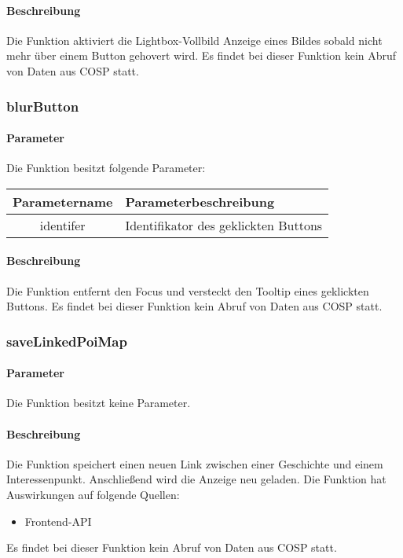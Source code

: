 \paragraph{Beschreibung} Die Funktion aktiviert die Lightbox-Vollbild Anzeige eines Bildes sobald nicht mehr über einem Button gehovert wird. Es findet bei dieser Funktion kein Abruf von Daten aus {\glqq COSP\grqq} statt.
\subsubsection{blurButton}
\paragraph{Parameter} Die Funktion besitzt folgende Parameter:
\begin{table}[H]
	\begin{tabular}{|c|p{11cm}|}
		\hline
		\textbf{Parametername} & \textbf{Parameterbeschreibung} \\ \hline
		identifer & Identifikator des geklickten Buttons \\ \hline
	\end{tabular}
\end{table}
\paragraph{Beschreibung} Die Funktion entfernt den Focus und versteckt den Tooltip eines geklickten Buttons. Es findet bei dieser Funktion kein Abruf von Daten aus {\glqq COSP\grqq} statt.
\subsubsection{saveLinkedPoiMap}
\paragraph{Parameter} Die Funktion besitzt keine Parameter.
\paragraph{Beschreibung} Die Funktion speichert einen neuen Link zwischen einer Geschichte und einem Interessenpunkt. Anschließend wird die Anzeige neu geladen. Die Funktion hat Auswirkungen auf folgende Quellen:
\begin{itemize}
	\item Frontend-API
\end{itemize}
Es findet bei dieser Funktion kein Abruf von Daten aus {\glqq COSP\grqq} statt.
